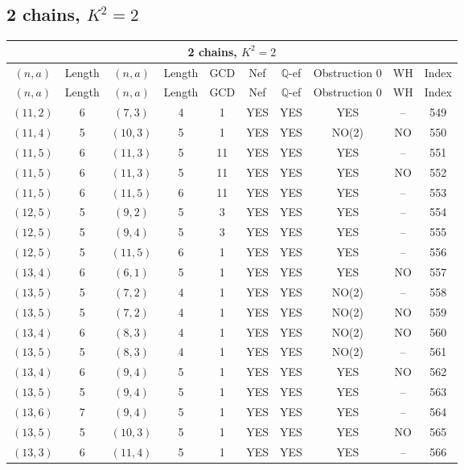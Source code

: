 \subsection{2 chains, $K^2 = 2$}
\begin{longtable}{|c|c|c|c|c|c|c|c|c|c|}
\hline
\multicolumn{10}{|c|}{2 chains, $K^2 = 2$}\\
\hline
$(n,a)$ & Length & $(n,a)$ & Length & GCD & Nef & $\mathbb Q$-ef & Obstruction 0 & WH & Index\\
\hline
\endfirsthead

\hline
$(n,a)$ & Length & $(n,a)$ & Length & GCD & Nef & $\mathbb Q$-ef & Obstruction 0 & WH & Index\\
\hline
\endhead
\hline
\endfoot

$(11, 2)$ & 6 & $(7, 3)$ & 4 & 1 & YES & YES & YES & -- & 549\\
$(11, 4)$ & 5 & $(10, 3)$ & 5 & 1 & YES & YES & NO(2) & NO & 550\\
$(11, 5)$ & 6 & $(11, 3)$ & 5 & 11 & YES & YES & YES & -- & 551\\
$(11, 5)$ & 6 & $(11, 3)$ & 5 & 11 & YES & YES & YES & NO & 552\\
$(11, 5)$ & 6 & $(11, 5)$ & 6 & 11 & YES & YES & YES & -- & 553\\
$(12, 5)$ & 5 & $(9, 2)$ & 5 & 3 & YES & YES & YES & -- & 554\\
$(12, 5)$ & 5 & $(9, 4)$ & 5 & 3 & YES & YES & YES & -- & 555\\
$(12, 5)$ & 5 & $(11, 5)$ & 6 & 1 & YES & YES & YES & -- & 556\\
$(13, 4)$ & 6 & $(6, 1)$ & 5 & 1 & YES & YES & YES & NO & 557\\
$(13, 5)$ & 5 & $(7, 2)$ & 4 & 1 & YES & YES & NO(2) & -- & 558\\
$(13, 5)$ & 5 & $(7, 2)$ & 4 & 1 & YES & YES & NO(2) & NO & 559\\
$(13, 4)$ & 6 & $(8, 3)$ & 4 & 1 & YES & YES & NO(2) & NO & 560\\
$(13, 5)$ & 5 & $(8, 3)$ & 4 & 1 & YES & YES & NO(2) & -- & 561\\
$(13, 4)$ & 6 & $(9, 4)$ & 5 & 1 & YES & YES & YES & NO & 562\\
$(13, 5)$ & 5 & $(9, 4)$ & 5 & 1 & YES & YES & YES & -- & 563\\
$(13, 6)$ & 7 & $(9, 4)$ & 5 & 1 & YES & YES & YES & -- & 564\\
$(13, 5)$ & 5 & $(10, 3)$ & 5 & 1 & YES & YES & YES & NO & 565\\
$(13, 3)$ & 6 & $(11, 4)$ & 5 & 1 & YES & YES & YES & -- & 566\\

\end{longtable}
